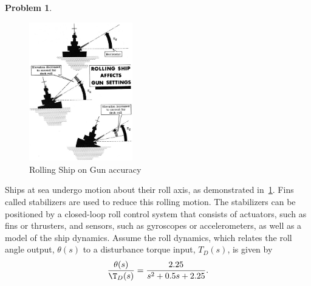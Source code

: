 \documentclass[10pt]{article}
\theoremstyle{definition}
\newtheorem{prob}{Problem}[section]
\begin{document}
\clearpage\newpage
\begin{prob}
    \begin{figure}[h]
        \centering
        \includegraphics[width=0.4\textwidth]{figures/partd-03.jpg}
        \caption{Rolling Ship on Gun accuracy~\label{fig:gun}}
    \end{figure}
    Ships at sea undergo motion about their roll axis, as demonstrated in~\cref{fig:gun}.
    Fins called stabilizers are used to reduce this rolling motion.
    The stabilizers can be positioned by a closed-loop roll control system that consists of actuators, such as fins or thrusters, and sensors, such as gyroscopes or accelerometers, as well as a model of the ship dynamics.
    Assume the roll dynamics, which relates the roll angle output, \( \theta (s) \) to a disturbance torque input, \( T_D(s)\), is given by
    \begin{align}
        \frac{\theta(s)}{\T_D(s)} = \frac{2.25}{s^2 + 0.5 s + 2.25} .
    \end{align}


\end{prob}
\end{document}

